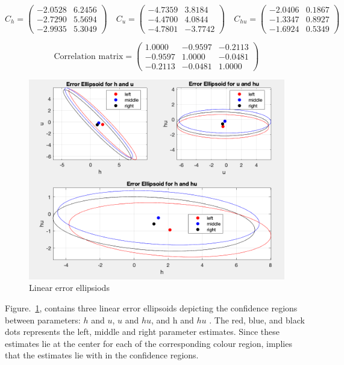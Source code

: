 \documentclass[12pt,a4paper]{article}
\begin{document}
\begin{small}
	\begin{equation}
		C_h = \begin{pmatrix}
			-2.0528	 & 6.2456	 \\
			-2.7290& 5.5694 \\
			-2.9935 &5.3049
		\end{pmatrix}
		\quad
		C_u= \begin{pmatrix}
			-4.7359 & 3.8184	\\
			-4.4700 & 4.0844 \\
			-4.7801 & -3.7742
		\end{pmatrix}
		\quad
		C_{hu}= \begin{pmatrix}
			-2.0406 & 0.1867\\
			-1.3347 & 0.8927 \\
			-1.6924 & 0.5349
		\end{pmatrix}
	\end{equation}
\end{small}


\begin{equation}
\text{Correlation matrix} = \begin{pmatrix}
		1.0000 & -0.9597 & -0.2113 \\
		-0.9597 & 1.0000 & -0.0481 \\
		-0.2113 & -0.0481 & 1.0000
	\end{pmatrix}
\end{equation}


	\begin{figure}[H]
	\centering
	\includegraphics[width=0.5\linewidth]{error_ellipsoid}
	\caption{ Linear error ellipsiods }
	\label{err}
\end{figure}
Figure.~\ref{err}, contains three linear error ellipsoids depicting the confidence regions between parameters: $h$ and $u$, $u$ and $hu$, and h and $hu$ . The red, blue, and black dots represents the left, middle and right parameter estimates. Since these estimates lie at the center for each of the corresponding colour region, implies that the estimates lie with in the confidence regions.
\end{document}
